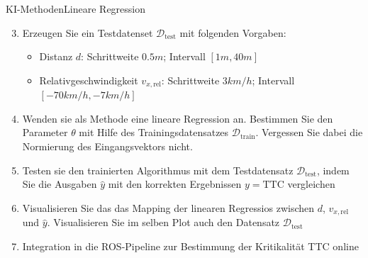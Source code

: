 \documentclass[169, handout	]{THIbeamer} %
\begin{document}
	\begin{frame}{KI-Methoden}{Lineare Regression}
		\begin{enumerate}
			\setcounter{enumi}{2}
			\item Erzeugen Sie ein Testdatenset $\mathcal{D}_{\text{test}}$ mit folgenden Vorgaben:
			\begin{itemize}
				\item Distanz $d$: Schrittweite $0.5m$; Intervall $[1m, 40m]$ 
				\item Relativgeschwindigkeit $v_{x,\text{rel}}$: Schrittweite $3 km/h$; Intervall $[-70 km/h, -7 km/h]$
			\end{itemize}
			\item Wenden sie als Methode eine lineare Regression an. Bestimmen Sie den Parameter $\theta$ mit Hilfe des Trainingsdatensatzes $\mathcal{D}_\text{train}$. Vergessen Sie dabei die Normierung des Eingangsvektors nicht.
			\item Testen sie den trainierten Algorithmus mit dem Testdatensatz $\mathcal{D}_\text{test}$, indem Sie die Ausgaben $\hat{y}$ mit den korrekten Ergebnissen $y = \text{TTC}$ vergleichen
			\item Visualisieren Sie das das Mapping der linearen Regressios zwischen $d$, $v_{x,\text{rel}}$ und $\hat{y}$. Visualisieren Sie im selben Plot auch den Datensatz $\mathcal{D}_\text{test}$
			\item Integration in die ROS-Pipeline zur Bestimmung der Kritikalität TTC online
		\end{enumerate}
	\end{frame}
\end{document}
